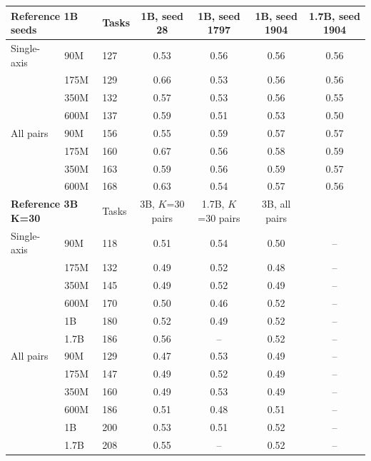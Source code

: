 \begin{tabular}{lllcccc}
\toprule
\multicolumn{2}{l}{\textbf{Reference 1B seeds}} & Tasks & 1B, seed 28 & 1B, seed 1797 & 1B, seed 1904 & 1.7B, seed 1904 \\
\midrule
Single-axis & 90M & 127 & 0.53 & 0.56 & 0.56 & 0.56 \\
 & 175M & 129 & 0.66 & 0.53 & 0.56 & 0.56 \\
 & 350M & 132 & 0.57 & 0.53 & 0.56 & 0.55 \\
 & 600M & 137 & 0.59 & 0.51 & 0.53 & 0.50 \\
All pairs & 90M & 156 & 0.55 & 0.59 & 0.57 & 0.57 \\
 & 175M & 160 & 0.67 & 0.56 & 0.58 & 0.59 \\
 & 350M & 163 & 0.59 & 0.56 & 0.59 & 0.57 \\
 & 600M & 168 & 0.63 & 0.54 & 0.57 & 0.56 \\
\midrule
\multicolumn{2}{l}{\textbf{Reference 3B K=30}} & Tasks & 3B, $K$=30 pairs & 1.7B, $K$=30 pairs & 3B, all pairs &  \\
\midrule
Single-axis & 90M & 118 & 0.51 & 0.54 & 0.50 & -- \\
 & 175M & 132 & 0.49 & 0.52 & 0.48 & -- \\
 & 350M & 145 & 0.49 & 0.52 & 0.49 & -- \\
 & 600M & 170 & 0.50 & 0.46 & 0.52 & -- \\
 & 1B & 180 & 0.52 & 0.49 & 0.52 & -- \\
 & 1.7B & 186 & 0.56 & -- & 0.52 & -- \\
All pairs & 90M & 129 & 0.47 & 0.53 & 0.49 & -- \\
 & 175M & 147 & 0.49 & 0.52 & 0.49 & -- \\
 & 350M & 160 & 0.49 & 0.53 & 0.49 & -- \\
 & 600M & 186 & 0.51 & 0.48 & 0.51 & -- \\
 & 1B & 200 & 0.53 & 0.51 & 0.52 & -- \\
 & 1.7B & 208 & 0.55 & -- & 0.52 & -- \\
\bottomrule
\end{tabular}
